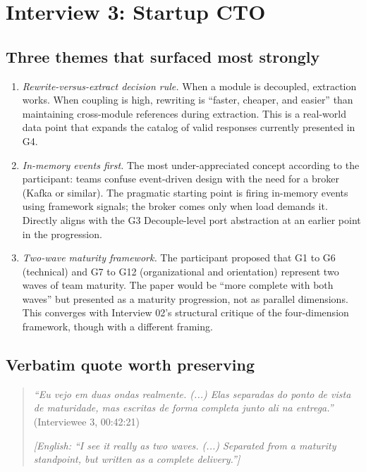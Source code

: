 
\section{Interview 3: Startup CTO}
\label{sec:interview03}

\subsection*{Three themes that surfaced most strongly}

\begin{enumerate}[itemsep=3pt,topsep=2pt]
  \item \emph{Rewrite-versus-extract decision rule.} When a module is decoupled, extraction works. When coupling is high, rewriting is ``faster, cheaper, and easier'' than maintaining cross-module references during extraction. This is a real-world data point that expands the catalog of valid responses currently presented in G4.
  \item \emph{In-memory events first.} The most under-appreciated concept according to the participant: teams confuse event-driven design with the need for a broker (Kafka or similar). The pragmatic starting point is firing in-memory events using framework signals; the broker comes only when load demands it. Directly aligns with the G3 Decouple-level port abstraction at an earlier point in the progression.
  \item \emph{Two-wave maturity framework.} The participant proposed that G1 to G6 (technical) and G7 to G12 (organizational and orientation) represent two waves of team maturity. The paper would be ``more complete with both waves'' but presented as a maturity progression, not as parallel dimensions. This converges with Interview 02's structural critique of the four-dimension framework, though with a different framing.
\end{enumerate}

\subsection*{Verbatim quote worth preserving}

\begin{quote}
\emph{``Eu vejo em duas ondas realmente. (...) Elas separadas do ponto de vista de maturidade, mas escritas de forma completa junto ali na entrega.''} (Interviewee 3, 00:42:21)

\medskip

\emph{[English: ``I see it really as two waves. (...) Separated from a maturity standpoint, but written as a complete delivery.'']}
\end{quote}

